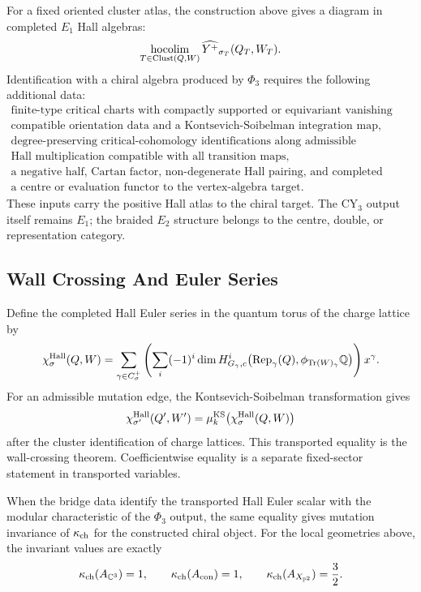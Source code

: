 For a fixed oriented cluster atlas, the construction above gives a
diagram in completed $E_1$ Hall algebras:
\[
  \operatorname*{hocolim}_{T\in\mathrm{Clust}(Q,W)}
  \widehat{Y^{+}}_{\sigma_T}(Q_T,W_T).
\]
Identification with a chiral algebra produced by $\Phi_3$ requires the
following additional data:
\[
\begin{gathered}
  \text{finite-type critical charts with compactly supported or
  equivariant vanishing cycles,}\\
  \text{compatible orientation data and a Kontsevich-Soibelman
  integration map,}\\
  \text{degree-preserving critical-cohomology identifications along
  admissible mutations,}\\
  \text{Hall multiplication compatible with all transition maps,}\\
  \text{a negative half, Cartan factor, non-degenerate Hall pairing,
  and completed double,}\\
  \text{a centre or evaluation functor to the vertex-algebra target.}
\end{gathered}
\]
These inputs carry the positive Hall atlas to the chiral target.  The
CY$_3$ output itself remains $E_1$; the braided $E_2$ structure belongs
to the centre, double, or representation category.

\subsection*{Wall Crossing And Euler Series}

Define the completed Hall Euler series in the quantum torus of the
charge lattice by
\[
  \chi^{\mathrm{Hall}}_{\sigma}(Q,W)
  =
  \sum_{\gamma\in C_{\sigma}^{+}}
  \left(
    \sum_i (-1)^i
    \dim H^i_{G_\gamma,c}
    \bigl(\mathrm{Rep}_\gamma(Q),
    \phi_{\mathrm{Tr}(W)_\gamma}\mathbb Q\bigr)
  \right)x^\gamma.
\]
For an admissible mutation edge, the Kontsevich-Soibelman
transformation gives
\[
  \chi^{\mathrm{Hall}}_{\sigma'}(Q',W')
  =
  \mu_k^{\mathrm{KS}}\bigl(\chi^{\mathrm{Hall}}_{\sigma}(Q,W)\bigr)
\]
after the cluster identification of charge lattices.  This transported
equality is the wall-crossing theorem.  Coefficientwise equality is a
separate fixed-sector statement in transported variables.

When the bridge data identify the transported Hall Euler scalar with
the modular characteristic of the $\Phi_3$ output, the same equality
gives mutation invariance of $\kappa_{\mathrm{ch}}$ for the constructed chiral object.
For the local geometries above, the invariant values are exactly
\[
  \kappa_{\mathrm{ch}}(A_{\mathbb{C}^3})=1,\qquad
  \kappa_{\mathrm{ch}}(A_{\mathrm{con}})=1,\qquad
  \kappa_{\mathrm{ch}}(A_{X_{\mathbb{P}^2}})=\frac32.
\]
